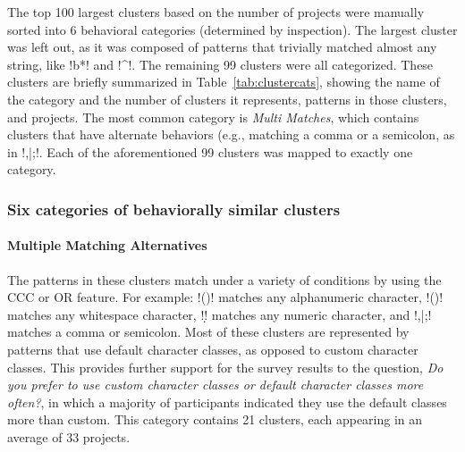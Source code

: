 

The top 100 largest clusters based on the number of projects were manually sorted into 6 behavioral categories (determined by inspection).  The largest cluster was left out, as it was composed of patterns that trivially matched almost any string, like \cverb!b*! and \cverb!^!.  The remaining 99 clusters were all categorized. These clusters are briefly summarized in Table~\ref{tab:clustercats}, showing the name of the category and the number of clusters it represents, patterns in those clusters, and projects. The most common category is \emph{Multi Matches}, which contains clusters that have alternate behaviors (e.g., matching a comma or a semicolon, as in \cverb!,|;!. Each of the aforementioned 99 clusters was mapped to exactly one category.


\subsubsection{Six categories of behaviorally similar clusters}
\label{sec:categoriesDefined}
\paragraph{Multiple Matching Alternatives}
The patterns in these clusters match under a variety of conditions by using the CCC or OR feature.  For example: \cverb!(\W)! matches any alphanumeric character, \cverb!(\s)! matches any whitespace character, \cverb!\d! matches any numeric character, and \cverb!,|;! matches a comma or semicolon.  Most of these clusters are represented by patterns that use default character classes, as opposed to custom character classes.  This provides further support for the survey results to the question, \emph{Do you prefer to use custom character classes or default character classes more often?}, in which a majority of participants indicated they use the default classes more than custom.
This category contains 21 clusters, each appearing in an average of 33 projects.

